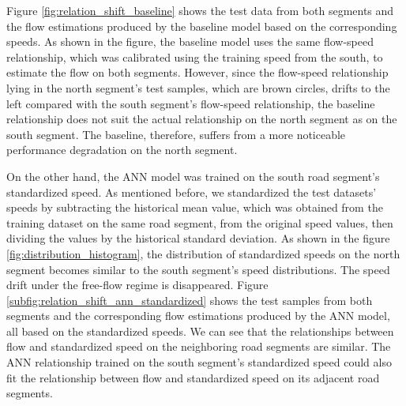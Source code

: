 \documentclass[english]{kththesis}
\begin{document}
Figure \ref{fig:relation_shift_baseline} shows the test data from both segments and the flow estimations produced by the baseline model based on the corresponding speeds. As shown in the figure, the baseline model uses the same flow-speed relationship, which was calibrated using the training speed from the south, to estimate the flow on both segments. However, since the flow-speed relationship lying in the north segment's test samples, which are brown circles, drifts to the left compared with the south segment's flow-speed relationship, the baseline relationship does not suit the actual relationship on the north segment as on the south segment. The baseline, therefore, suffers from a more noticeable performance degradation on the north segment.

On the other hand, the ANN model was trained on the south road segment's standardized speed. As mentioned before, we standardized the test datasets' speeds by subtracting the historical mean value, which was obtained from the training dataset on the same road segment, from the original speed values, then dividing the values by the historical standard deviation. As shown in the figure \ref{fig:distribution_histogram}, the distribution of standardized speeds on the north segment becomes similar to the south segment's speed distributions. The speed drift under the free-flow regime is disappeared. Figure \ref{subfig:relation_shift_ann_standardized} shows the test samples from both segments and the corresponding flow estimations produced by the ANN model, all based on the standardized speeds. We can see that the relationships between flow and standardized speed on the neighboring road segments are similar. The ANN relationship trained on the south segment's standardized speed could also fit the relationship between flow and standardized speed on its adjacent road segments.  
\end{document}
